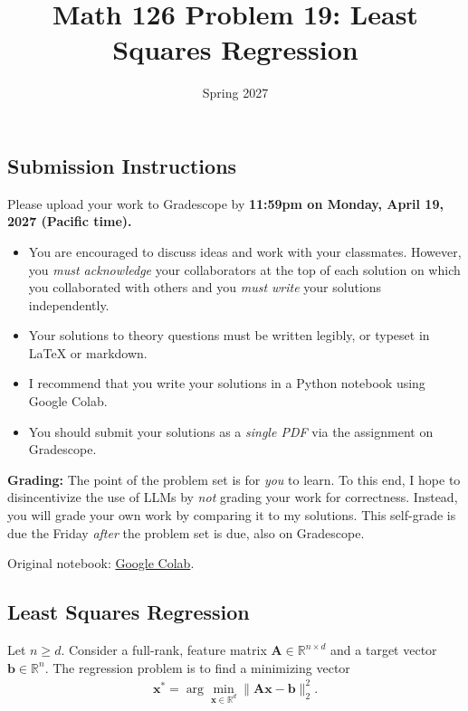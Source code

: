 \documentclass{article}
\title{Math 126 Problem 19: Least Squares Regression}
\author{} %
\date{Spring 2027}
\begin{document}
\maketitle

\hypertarget{submission-instructions}{%
\subsection*{Submission Instructions}\label{submission-instructions}}

Please upload your work to Gradescope by \textbf{11:59pm on Monday, April 19, 2027 (Pacific time).}

\begin{itemize}
\item
  You are encouraged to discuss ideas and work with your classmates. However, you \emph{must acknowledge} your collaborators at the top of each solution on which you collaborated with others and you \emph{must write} your solutions independently.
\item
  Your solutions to theory questions must be written legibly, or typeset in LaTeX or markdown.
\item
  I recommend that you write your solutions in a Python notebook using Google Colab.
\item
  You should submit your solutions as a \emph{single PDF} via the assignment on Gradescope.
\end{itemize}

\textbf{Grading:} The point of the problem set is for \emph{you} to learn. To this end, I hope to disincentivize the use of LLMs by \emph{not} grading your work for correctness. Instead, you will grade your own work by comparing it to my solutions. This self-grade is due the Friday \emph{after} the problem set is due, also on Gradescope.

\noindent Original notebook: \href{https://colab.research.google.com/drive/19zPXyyDEFFtQ04rdEqAKh5Osd2ybwI1S?usp=sharing}{Google Colab}.

\hypertarget{least-squares-regression}{%
\subsection*{Least Squares Regression}\label{least-squares-regression}}

Let \(n \geq d\). Consider a full-rank, feature matrix \(\mathbf{A} \in \mathbb{R}^{n \times d}\) and a target vector \(\mathbf{b} \in \mathbb{R}^n\). The regression problem is to find a minimizing vector \begin{align*}
\mathbf{x}^* = \arg \min_{\mathbf{x} \in \mathbb{R}^d}
\| \mathbf{Ax} - \mathbf{b} \|_2^2.
\end{align*}
\end{document}
